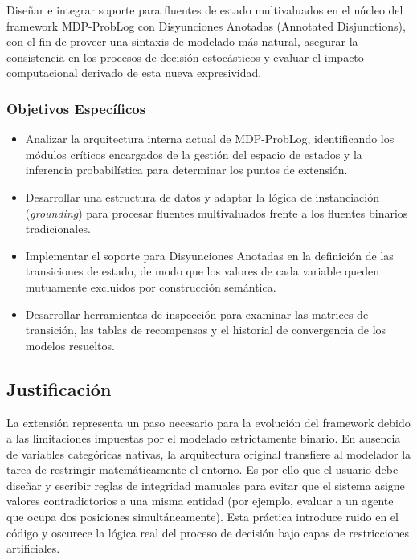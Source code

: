 Diseñar e integrar soporte para fluentes de estado multivaluados en el núcleo del framework MDP-ProbLog con Disyunciones Anotadas (Annotated Disjunctions), con el fin de proveer una sintaxis de modelado más natural, asegurar la consistencia en los procesos de decisión estocásticos y evaluar el impacto computacional derivado de esta nueva expresividad.

\subsubsection{Objetivos Específicos}
\label{subsec:objetivos_especificos}

\begin{itemize}
    \item Analizar la arquitectura interna actual de MDP-ProbLog, identificando los módulos críticos encargados de la gestión del espacio de estados y la inferencia probabilística para determinar los puntos de extensión.
    \item Desarrollar una estructura de datos y adaptar la lógica de instanciación (\textit{grounding}) para procesar fluentes multivaluados frente a los fluentes binarios tradicionales.
    \item Implementar el soporte para Disyunciones Anotadas en la definición de las transiciones de estado, de modo que los valores de cada variable queden mutuamente excluidos por construcción semántica.
    \item Desarrollar herramientas de inspección para examinar las matrices de transición, las tablas de recompensas y el historial de convergencia de los modelos resueltos.
\end{itemize}

\subsection{Justificación}
\label{sec:justificacion}

La extensión representa un paso necesario para la evolución del framework debido a las limitaciones impuestas por el modelado estrictamente binario. En ausencia de variables categóricas nativas, la arquitectura original transfiere al modelador la tarea de restringir matemáticamente el entorno. Es por ello que el usuario debe diseñar y escribir reglas de integridad manuales para evitar que el sistema asigne valores contradictorios a una misma entidad (por ejemplo, evaluar a un agente que ocupa dos posiciones simultáneamente). Esta práctica introduce ruido en el código y oscurece la lógica real del proceso de decisión bajo capas de restricciones artificiales.


